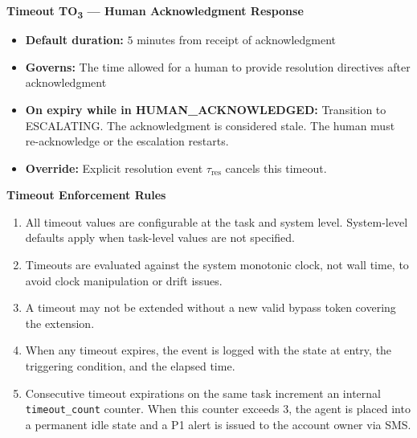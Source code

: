 \bigskip
\noindent\textbf{Timeout TO\textsubscript{3} — Human Acknowledgment Response}

\begin{itemize}
  \item \textbf{Default duration:} $5$ minutes from receipt of acknowledgment
  \item \textbf{Governs:} The time allowed for a human to provide resolution directives after acknowledgment
  \item \textbf{On expiry while in HUMAN\_ACKNOWLEDGED:} Transition to ESCALATING. The acknowledgment is considered stale. The human must re-acknowledge or the escalation restarts.
  \item \textbf{Override:} Explicit resolution event $\tau_{\text{res}}$ cancels this timeout.
\end{itemize}

\bigskip
\bigskip
\noindent\textbf{Timeout Enforcement Rules}

\begin{enumerate}
  \item All timeout values are configurable at the task and system level. System-level defaults apply when task-level values are not specified.
  \item Timeouts are evaluated against the system monotonic clock, not wall time, to avoid clock manipulation or drift issues.
  \item A timeout may not be extended without a new valid bypass token covering the extension.
  \item When any timeout expires, the event is logged with the state at entry, the triggering condition, and the elapsed time.
  \item Consecutive timeout expirations on the same task increment an internal \texttt{timeout\_count} counter. When this counter exceeds $3$, the agent is placed into a permanent idle state and a P1 alert is issued to the account owner via SMS.
\end{enumerate}
